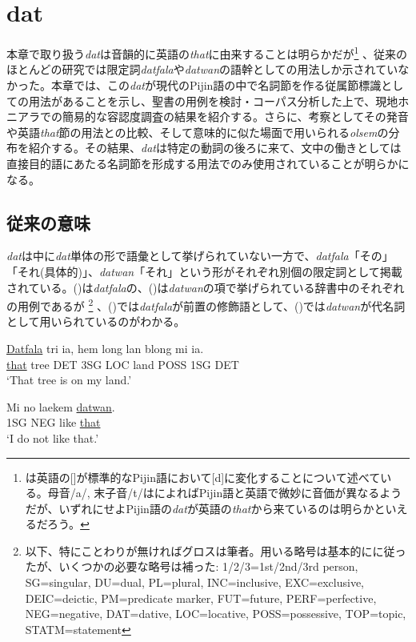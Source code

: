 \chapter{dat}

本章で取り扱う\textit{dat}は音韻的に英語の\textit{that}に由来することは明らかだが\footnote{
\cite{phonology}は英語の[]が標準的なPijin語において[d]に変化することについて述べている。母音/a/, 末子音/t/は\cite{phonology}によればPijin語と英語で微妙に音価が異なるようだが、いずれにせよPijin語の\textit{dat}が英語の\textit{that}から来ているのは明らかといえるだろう。
}
、従来のほとんどの研究では限定詞\textit{datfala}や\textit{datwan}の語幹としての用法しか示されていなかった。本章では、この\textit{dat}が現代のPijin語の中で名詞節を作る従属節標識としての用法があることを示し、聖書の用例を検討・コーパス分析した上で、現地ホニアラでの簡易的な容認度調査の結果を紹介する。さらに、考察としてその発音や英語\textit{that}節の用法との比較、そして意味的に似た場面で用いられる\textit{olsem}の分布を紹介する。その結果、\textit{dat}は特定の動詞の後ろに来て、文中の働きとしては直接目的語にあたる名詞節を形成する用法でのみ使用されていることが明らかになる。

\section{従来の意味}

\textit{dat}は\cite{dictionary}中に\textit{dat}単体の形で語彙として挙げられていない一方で、\textit{datfala}「その」「それ(具体的)」、\textit{datwan}「それ」という形がそれぞれ別個の限定詞として掲載されている。()は\textit{datfala}の、()は\textit{datwan}の項で挙げられている辞書中のそれぞれの用例であるが
\footnote{
以下、特にことわりが無ければグロスは筆者。用いる略号は基本的に\cite{prepositions}に従ったが、いくつかの必要な略号は補った: 1/2/3=1st/2nd/3rd person, SG=singular, DU=dual, PL=plural, INC=inclusive, EXC=exclusive, DEIC=deictic, PM=predicate marker, FUT=future, PERF=perfective, NEG=negative, DAT=dative, LOC=locative, POSS=possessive, TOP=topic, STATM=statement}
、()では\textit{datfala}が前置の修飾語として、()では\textit{datwan}が代名詞として用いられているのがわかる。

\begin{exe}
  \ex
  \gll \underline{Datfala} tri ia, hem long lan blong mi ia.\\
  \underline{that} tree DET 3SG LOC land POSS 1SG DET\\
  \glt `That tree is on my land.' \cite[34]{dictionary}

  \ex
  \gll Mi no laekem \underline{datwan}.\\
  1SG NEG like \underline{that}\\
  \glt `I do not like that.' \cite[34]{dictionary}
\end{exe}

